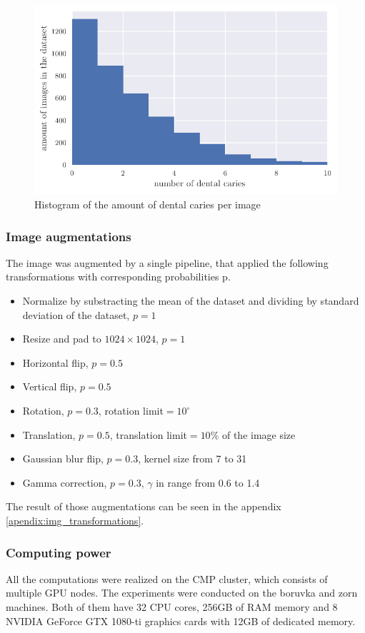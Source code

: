 \begin{figure}
    \includegraphics[width=\linewidth]{images/caries_histogram.pdf}
    \caption{Histogram of the amount of dental caries per image}
    \label{fig:hist_caries_per_img}
\end{figure}
\subsubsection{Image augmentations}
The image was augmented by a single pipeline, that applied the following transformations with corresponding probabilities p.
\begin{itemize}
    \item Normalize by substracting the mean of the dataset and dividing by standard deviation of the dataset, $p=1$
    \item Resize and pad to $1024\times1024$, $p=1$
    \item Horizontal flip, $p=0.5$
    \item Vertical flip, $p=0.5$
    \item Rotation, $p=0.3$, rotation limit$=10^{\circ}$
    \item Translation, $p=0.5$, translation limit$=10\%$ of the image size
    \item Gaussian blur flip, $p=0.3$, kernel size from 7 to 31
    \item Gamma correction, $p=0.3$, $\gamma$ in range from 0.6 to 1.4
\end{itemize}

The result of those augmentations can be seen in the appendix \ref{apendix:img_transformations}.
\subsubsection{Computing power}
All the computations were realized on the CMP cluster, which consists of multiple GPU nodes. The experiments were conducted on the boruvka and zorn machines. Both of them have 32 CPU cores, 256GB of RAM memory and 8 NVIDIA GeForce GTX 1080-ti graphics cards with 12GB of dedicated memory.

